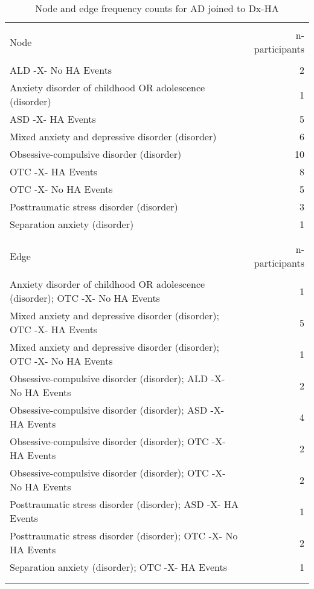 \documentclass[10pt, letterpaper]{article}
\begin{document}
\begin{spacing}{1.0}
\begin{small}
    \begin{longtable}[H]{p{5in}r}
        \caption{Node and edge frequency counts for AD joined to Dx-HA}\\
        \hline\\[-8pt]
        Node & n-participants\\
        \hline\\[-6pt]
        ALD -X- No HA Events & 2 \\
        \rowcolor{ltBlue}
        Anxiety disorder of childhood OR adolescence (disorder) & 1 \\
        ASD -X- HA Events & 5 \\
        \rowcolor{ltBlue}
        Mixed anxiety and depressive disorder (disorder) & 6 \\
        Obsessive-compulsive disorder (disorder) & 10 \\
        \rowcolor{ltBlue}
        OTC -X- HA Events & 8 \\
        OTC -X- No HA Events & 5 \\
        \rowcolor{ltBlue}
        Posttraumatic stress disorder (disorder) & 3 \\
        Separation anxiety (disorder) & 1 \\
        &\\[-6pt]
        \hline\\[-8pt]
        Edge & n-participants\\
        \hline\\[-6pt]
        Anxiety disorder of childhood OR adolescence (disorder); OTC -X- No HA Events & 1 \\
        \rowcolor{ltBlue}
        Mixed anxiety and depressive disorder (disorder); OTC -X- HA Events & 5 \\
        Mixed anxiety and depressive disorder (disorder); OTC -X- No HA Events & 1 \\
        \rowcolor{ltBlue}
        Obsessive-compulsive disorder (disorder); ALD -X- No HA Events & 2 \\
        Obsessive-compulsive disorder (disorder); ASD -X- HA Events & 4 \\
        \rowcolor{ltBlue}
        Obsessive-compulsive disorder (disorder); OTC -X- HA Events & 2 \\
        Obsessive-compulsive disorder (disorder); OTC -X- No HA Events & 2 \\
        \rowcolor{ltBlue}
        Posttraumatic stress disorder (disorder); ASD -X- HA Events & 1 \\
        Posttraumatic stress disorder (disorder); OTC -X- No HA Events & 2 \\
        \rowcolor{ltBlue}
        Separation anxiety (disorder); OTC -X- HA Events & 1 \\
        & \\[-6pt]
        \hline
        \label{tab:AD-Dx-HA-01}
    \end{longtable}
\end{small}
\clearpage


\end{spacing}
\end{document}

